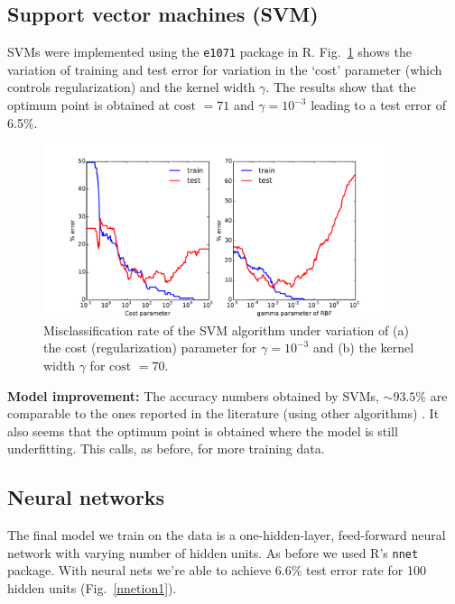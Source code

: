 \documentclass[10pt,letterpaper]{article}
\begin{document}
\subsection{Support vector machines (SVM)}
SVMs were implemented using the {\tt e1071} package in R. Fig.~\ref{svmion1} shows the variation of training and test error for variation in the `cost' parameter (which controls regularization) and the kernel width $\gamma$. The results show that the optimum point is obtained at $\text{cost }=71$ and $\gamma = 10^{-3}$ leading to a test error of 6.5\%. 
\begin{figure}[!tbp]
	\begin{center}
	\includegraphics[width=4in]{../results/ionosphere/svm/error_vs_cost_gamma.pdf}
	\end{center}
	\caption{Misclassification rate of the SVM algorithm under variation of (a) the cost (regularization) parameter for $\gamma=10^{-3}$ and (b) the kernel width $\gamma$ for $\text{cost }=70 $. \label{svmion1}}
\end{figure}

{\bf Model improvement: } The accuracy numbers obtained by SVMs, $\sim 93.5\%$ are comparable to the ones reported in the literature (using other algorithms) \cite{ionosphere}. It also seems that the optimum point is obtained where the model is still underfitting. This calls, as before, for more training data. 
\subsection{Neural networks}
The final model we train on the data is a one-hidden-layer, feed-forward neural network with varying number of hidden units. As before we used R's {\tt nnet} package. With neural nets we're able to achieve 6.6\% test error rate for 100 hidden units (Fig.~\ref{nnetion1}).
\end{document}
